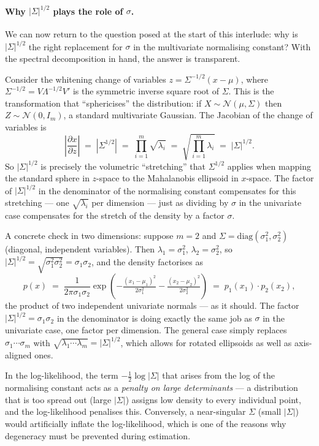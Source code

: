 \documentclass[11pt, a4paper, oneside]{article}
\begin{document}
\paragraph{Why $|\Sigma|^{1/2}$ plays the role of $\sigma$.}
We can now return to the question posed at the start of this interlude:
why is $|\Sigma|^{1/2}$ the right replacement for $\sigma$ in the
multivariate normalising constant? With the spectral decomposition in
hand, the answer is transparent.

Consider the whitening change of variables $z = \Sigma^{-1/2}(x - \mu)$,
where $\Sigma^{-1/2} = V \Lambda^{-1/2} V'$ is the symmetric inverse
square root of $\Sigma$. This is the transformation that ``sphericises''
the distribution: if $X \sim \mathcal{N}(\mu, \Sigma)$ then
$Z \sim \mathcal{N}(0, I_m)$, a standard multivariate Gaussian. The
Jacobian of the change of variables is
\[
\left|\frac{\partial x}{\partial z}\right| \;=\; |\Sigma^{1/2}| \;=\; \prod_{i=1}^{m} \sqrt{\lambda_i} \;=\; \sqrt{\prod_{i=1}^{m} \lambda_i} \;=\; |\Sigma|^{1/2}.
\]
So $|\Sigma|^{1/2}$ is precisely the volumetric ``stretching'' that
$\Sigma^{1/2}$ applies when mapping the standard sphere in $z$-space to
the Mahalanobis ellipsoid in $x$-space. The factor of $|\Sigma|^{1/2}$
in the denominator of the normalising constant compensates for this
stretching — one $\sqrt{\lambda_i}$ per dimension — just as dividing
by $\sigma$ in the univariate case compensates for the stretch of the
density by a factor $\sigma$.

A concrete check in two dimensions: suppose $m = 2$ and
$\Sigma = \mathrm{diag}(\sigma_1^{2}, \sigma_2^{2})$ (diagonal,
independent variables). Then $\lambda_1 = \sigma_1^2$,
$\lambda_2 = \sigma_2^2$, so
$|\Sigma|^{1/2} = \sqrt{\sigma_1^2 \sigma_2^2} = \sigma_1 \sigma_2$, and
the density factorises as
\[
p(x) \;=\; \frac{1}{2\pi \sigma_1 \sigma_2}
\exp\!\left(-\tfrac{(x_1-\mu_1)^2}{2\sigma_1^{2}} - \tfrac{(x_2-\mu_2)^2}{2\sigma_2^{2}}\right)
\;=\; p_1(x_1) \cdot p_2(x_2),
\]
the product of two independent univariate normals — as it should. The
factor $|\Sigma|^{1/2} = \sigma_1 \sigma_2$ in the denominator is doing
exactly the same job as $\sigma$ in the univariate case, one factor per
dimension. The general case simply replaces $\sigma_1 \cdots \sigma_m$
with $\sqrt{\lambda_1 \cdots \lambda_m} = |\Sigma|^{1/2}$, which allows
for rotated ellipsoids as well as axis-aligned ones.

In the log-likelihood, the term $-\tfrac{1}{2}\log|\Sigma|$ that arises
from the log of the normalising constant acts as a \emph{penalty on
large determinants} — a distribution that is too spread out (large
$|\Sigma|$) assigns low density to every individual point, and the
log-likelihood penalises this. Conversely, a near-singular $\Sigma$
(small $|\Sigma|$) would artificially inflate the log-likelihood,
which is one of the reasons why degeneracy must be prevented during
estimation.
\end{document}
